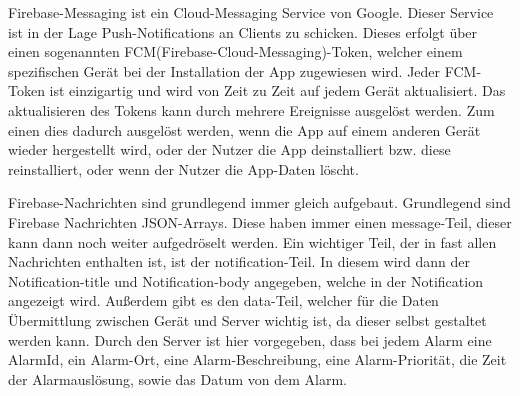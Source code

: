 \noindent Firebase-Messaging ist ein Cloud-Messaging Service von Google. Dieser Service ist in der Lage Push-Notifications an 
Clients zu schicken. Dieses erfolgt über einen sogenannten FCM(Firebase-Cloud-Messaging)-Token, welcher einem spezifischen Gerät
bei der Installation der App zugewiesen wird. Jeder FCM-Token ist einzigartig und wird von Zeit zu Zeit auf jedem Gerät aktualisiert.\cite{FCM-Update}
Das aktualisieren des Tokens kann durch mehrere Ereignisse ausgelöst werden. Zum einen dies dadurch ausgelöst werden, wenn die App auf einem anderen 
Gerät wieder hergestellt wird, oder der Nutzer die App deinstalliert bzw. diese reinstalliert, oder wenn der Nutzer die App-Daten löscht.

\noindent Firebase-Nachrichten sind grundlegend immer gleich aufgebaut. Grundlegend sind Firebase Nachrichten JSON-Arrays. Diese haben immer einen
message-Teil, dieser kann dann noch weiter aufgedröselt werden. Ein wichtiger Teil, der in fast allen Nachrichten enthalten ist, ist der notification-Teil. 
In diesem wird dann der Notification-title und Notification-body angegeben, welche in der Notification angezeigt wird.
Außerdem gibt es den data-Teil, welcher für die Daten Übermittlung zwischen Gerät und Server wichtig ist, da dieser selbst gestaltet werden kann.
Durch den Server ist hier vorgegeben, dass bei jedem Alarm eine AlarmId, ein Alarm-Ort, eine Alarm-Beschreibung, eine Alarm-Priorität, die Zeit der Alarmauslösung, sowie das Datum von dem Alarm.

